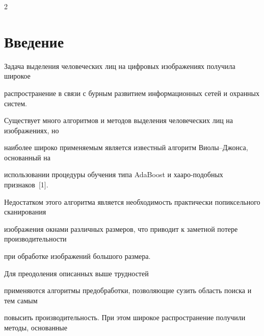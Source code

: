 \vspace*{2pt}






\vspace*{9pt}






      \thispagestyle{headings}



      \begin{multicols}{2}



            \label{st\stat}





\section{Введение}



      Задача выделения человеческих лиц на цифровых изображениях получила широкое 

распространение в связи с бурным развитием информационных сетей и охранных систем. 



Существует много алгоритмов и методов выделения человеческих лиц на изображениях, но 

наиболее широко применяемым является известный алгоритм Вио\-лы--Джон\-са, основанный на 

использовании процедуры обучения типа AdaBoost и хааро-по\-доб\-ных признаков~[1]. 

Недостатком этого алгоритма является необходимость практически попиксельного сканирования 

изображения окнами различных размеров, что приводит к заметной потере про\-из\-во\-ди\-тель\-ности 

при обработке изображений большого размера. 



Для преодоления описанных выше трудностей 

применяются алгоритмы предобработки, позволяющие сузить область поиска и тем самым 

повысить производительность. При этом широкое распространение получили методы, основанные 


\end{multicols}
